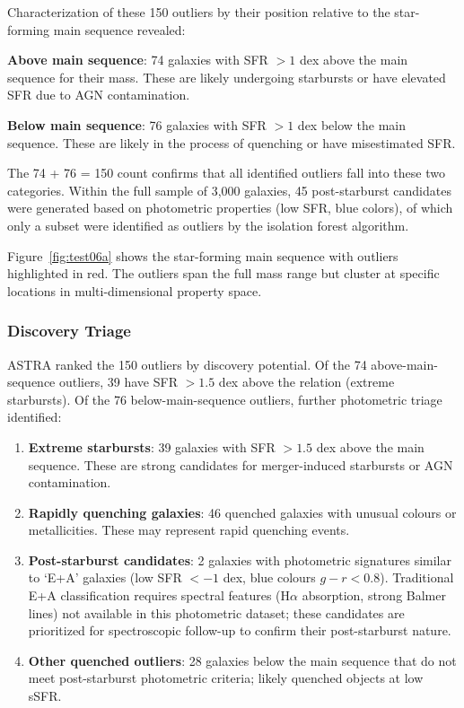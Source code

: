 \documentclass[usenatbib]{rasti}
\begin{document}
Characterization of these 150 outliers by their position relative to the star-forming main sequence revealed:
\begin{description}
\item \textbf{Above main sequence}: 74 galaxies with SFR $>1$ dex above the main sequence for their mass. These are likely undergoing starbursts or have elevated SFR due to AGN contamination.
\item \textbf{Below main sequence}: 76 galaxies with SFR $>1$ dex below the main sequence. These are likely in the process of quenching or have misestimated SFR.
\end{description}
The 74 + 76 = 150 count confirms that all identified outliers fall into these two categories. Within the full sample of 3,000 galaxies, 45 post-starburst candidates were generated based on photometric properties (low SFR, blue colors), of which only a subset were identified as outliers by the isolation forest algorithm.

Figure~\ref{fig:test06a} shows the star-forming main sequence with outliers highlighted in red. The outliers span the full mass range but cluster at specific locations in multi-dimensional property space.

\subsubsection{Discovery Triage}

ASTRA ranked the 150 outliers by discovery potential. Of the 74 above-main-sequence outliers, 39 have SFR $> 1.5$ dex above the relation (extreme starbursts). Of the 76 below-main-sequence outliers, further photometric triage identified:

\begin{enumerate}
\item \textbf{Extreme starbursts}: 39 galaxies with SFR $> 1.5$ dex above the main sequence. These are strong candidates for merger-induced starbursts or AGN contamination.
\item \textbf{Rapidly quenching galaxies}: 46 quenched galaxies with unusual colours or metallicities. These may represent rapid quenching events.
\item \textbf{Post-starburst candidates}: 2 galaxies with photometric signatures similar to `E+A' galaxies (low SFR $< -1$ dex, blue colours $g-r < 0.8$). Traditional E+A classification requires spectral features (H$\alpha$ absorption, strong Balmer lines) not available in this photometric dataset; these candidates are prioritized for spectroscopic follow-up to confirm their post-starburst nature.
\item \textbf{Other quenched outliers}: 28 galaxies below the main sequence that do not meet post-starburst photometric criteria; likely quenched objects at low sSFR.
\end{enumerate}
\end{document}
